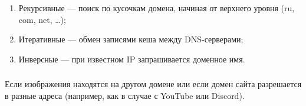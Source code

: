 \subsubsection{}
\begin{enumerate}
    \item Рекурсивные --- поиск по кусочкам домена, начиная от верхнего уровня (ru, com, net, \ldots);
    \item Итеративные --- обмен записями кеша между DNS-серверами;
    \item Инверсные --- при известном IP запрашивается доменное имя.
\end{enumerate}

\subsubsection{}
Если изображения находятся на другом домене или если домен сайта разрешается в разные адреса (например,
как в случае с YouTube или Discord).
